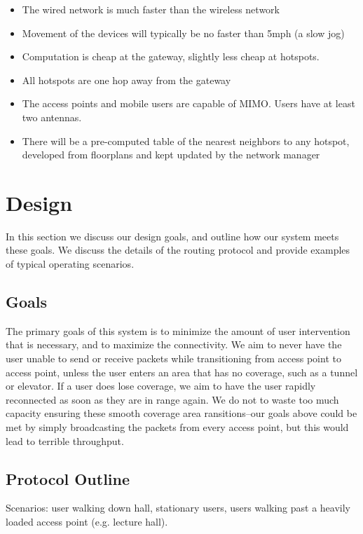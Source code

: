 \documentclass[letterpaper,12pt]{article}
\begin{document}
\begin{itemize}
\item The wired network is much faster than the wireless network
\item Movement of the devices will typically be no faster than 5mph (a slow jog)
\item Computation is cheap at the gateway, slightly less cheap at hotspots.
\item All hotspots are one hop away from the gateway
\item The access points and mobile users are capable of MIMO. Users have at 
least two antennas. 
\item There will be a pre-computed table of the nearest neighbors to any 
hotspot, developed from floorplans and kept updated by the network manager
\end{itemize}

\section{Design} \label{sec:design}

In this section we discuss our design goals, and outline how our system
meets these goals. We discuss the details of the routing protocol and provide 
examples of typical operating scenarios.

\subsection{Goals}
The primary goals of this system is to minimize the amount of user 
intervention that is necessary, and to maximize the connectivity.
We aim to never have the user unable to send or receive packets while 
transitioning from access point to access point, unless the user enters an area
that has no coverage, such as a tunnel or elevator. If a user does lose coverage,
we aim to have the user rapidly reconnected as soon as they are in range again.
We do not to waste too much capacity ensuring these smooth coverage area 
ransitions--our goals above could be met by simply broadcasting the packets
from every access point, but this would lead to terrible throughput.

\subsection{Protocol Outline}

Scenarios: user walking down hall, stationary users, users walking past
a heavily loaded access point (e.g. lecture hall).
\end{document}
